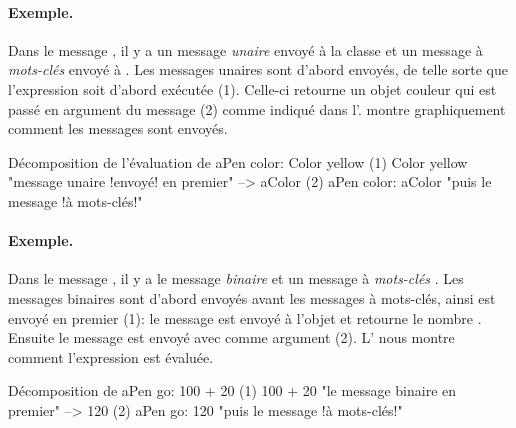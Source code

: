 \documentclass[a4paper,10pt,twoside]{book}
\begin{document}
\paragraph{Exemple.}
Dans le message , il y a un message \emph{unaire}  
envoyé à la classe  et un message à \emph{mots-clés}  envoyé à . 
Les messages unaires sont d'abord envoyés, de telle sorte que l'expression  
soit d'abord exécutée (1). Celle-ci retourne un objet couleur qui est passé en argument du 
message  (2) comme indiqué dans l'.
 montre graphiquement comment les messages sont envoyés.

\begin{example}[decColor]{Décomposition de l'évaluation de }{}
        aPen color: Color yellow
(1)                       Color yellow        "message unaire !envoyé! en premier"
                        --> aColor
(2)   aPen color: aColor                 "puis le message !à mots-clés!"
\end{example}

\paragraph{Exemple.} Dans le message , il y a le message \emph{binaire}  et un message à \emph{mots-clés} . Les messages binaires sont d'abord envoyés avant les messages à mots-clés, ainsi  est envoyé en premier (1): le message  est envoyé à l'objet  et retourne le nombre . Ensuite le message  est envoyé avec comme argument  (2).
L' nous montre comment l'expression est évaluée. 

\begin{example}[decGo]{Décomposition de }{}
      aPen go: 100 + 20   
(1)                 100 + 20           "le message binaire en premier"
                   -->   120
(2)  aPen go: 120                   "puis le message !à mots-clés!"
\end{example}
\end{document}
